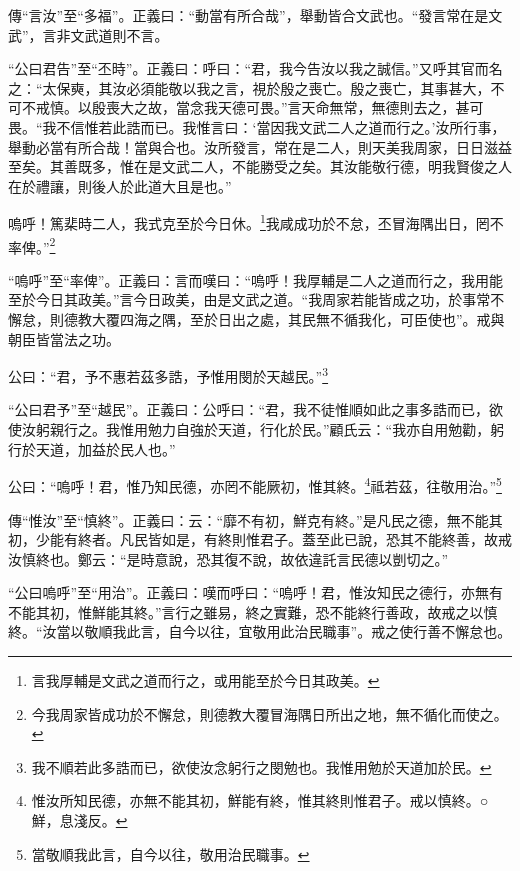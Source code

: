 {\noindent\zhuan{}\fzbyks 傳“言汝”至“多福”。正義曰：“動當有所合哉”，舉動皆合文武也。“發言常在是文武”，言非文武道則不言。 \par}

{\noindent\shu{}\fzkt “公曰君告”至“丕時”。正義曰：呼曰：“君，我今告汝以我之誠信。”又呼其官而名之：“太保奭，其汝必須能敬以我之言，視於殷之喪亡。殷之喪亡，其事甚大，不可不戒慎。以殷喪大之故，當念我天德可畏。”言天命無常，無德則去之，甚可畏。“我不信惟若此誥而已。我惟言曰：‘當因我文武二人之道而行之。’汝所行事，舉動必當有所合哉！當與合也。汝所發言，常在是二人，則天美我周家，日日滋益至矣。其善既多，惟在是文武二人，不能勝受之矣。其汝能敬行德，明我賢俊之人在於禮讓，則後人於此道大且是也。” \par}

嗚呼！篤棐時二人，我式克至於今日休。\footnote{言我厚輔是文武之道而行之，或用能至於今日其政美。}我咸成功於不怠，丕冒海隅出日，罔不率俾。”\footnote{今我周家皆成功於不懈怠，則德教大覆冒海隅日所出之地，無不循化而使之。}

{\noindent\shu{}\fzkt “嗚呼”至“率俾”。正義曰：言而嘆曰：“嗚呼！我厚輔是二人之道而行之，我用能至於今日其政美。”言今日政美，由是文武之道。“我周家若能皆成之功，於事常不懈怠，則德教大覆四海之隅，至於日出之處，其民無不循我化，可臣使也”。戒與朝臣皆當法之功。 \par}

公曰：“君，予不惠若茲多誥，予惟用閔於天越民。”\footnote{我不順若此多誥而已，欲使汝念躬行之閔勉也。我惟用勉於天道加於民。}

{\noindent\shu{}\fzkt “公曰君予”至“越民”。正義曰：公呼曰：“君，我不徒惟順如此之事多誥而已，欲使汝躬親行之。我惟用勉力自強於天道，行化於民。”顧氏云：“我亦自用勉勸，躬行於天道，加益於民人也。” \par}

公曰：“嗚呼！君，惟乃知民德，亦罔不能厥初，惟其終。\footnote{惟汝所知民德，亦無不能其初，鮮能有終，惟其終則惟君子。戒以慎終。○鮮，息淺反。}祗若茲，往敬用治。”\footnote{當敬順我此言，自今以往，敬用治民職事。}


{\noindent\zhuan{}\fzbyks 傳“惟汝”至“慎終”。正義曰：云：“靡不有初，鮮克有終。”是凡民之德，無不能其初，少能有終者。凡民皆如是，有終則惟君子。蓋至此已說，恐其不能終善，故戒汝慎終也。鄭云：“是時意說，恐其復不說，故依違託言民德以剴切之。” \par}

{\noindent\shu{}\fzkt “公曰嗚呼”至“用治”。正義曰：嘆而呼曰：“嗚呼！君，惟汝知民之德行，亦無有不能其初，惟鮮能其終。”言行之雖易，終之實難，恐不能終行善政，故戒之以慎終。“汝當以敬順我此言，自今以往，宜敬用此治民職事”。戒之使行善不懈怠也。 \par}

